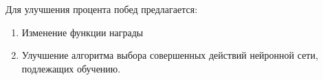 \begin{Large}
Для улучшения процента побед предлагается:
\begin{spacing}{0.9}
\begin{enumerate}
    \item Изменение функции награды
    \item Улучшение алгоритма выбора совершенных действий нейронной сети, подлежащих обучению.
\end{enumerate}
\end{spacing}
\end{Large}